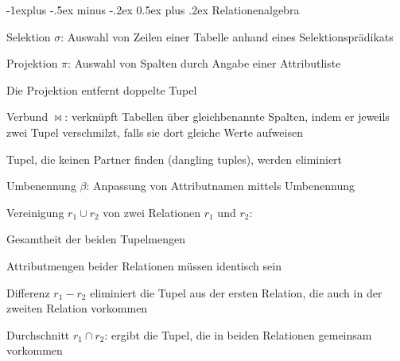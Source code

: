 \documentclass[a4paper]{article}
\makeatletter
\renewcommand{\subsection}{\@startsection{subsection}{2}{0mm}%
                                {-1explus -.5ex minus -.2ex}%
                                {0.5ex plus .2ex}%
                                {\normalfont\normalsize\bfseries}}
\makeatother
\begin{document}
\begin{multicols}{3}
    \subsection{Relationenalgebra}
    \begin{itemize*}
        \item Selektion $\sigma$: Auswahl von Zeilen einer Tabelle anhand eines Selektionsprädikats
        \item Projektion $\pi$: Auswahl von Spalten durch Angabe einer Attributliste
        \begin{itemize*}
            \item Die Projektion entfernt doppelte Tupel
        \end{itemize*}
        \item Verbund $\bowtie$: verknüpft Tabellen über gleichbenannte Spalten, indem er jeweils zwei Tupel verschmilzt, falls sie dort gleiche Werte aufweisen
        \begin{itemize*}
            \item Tupel, die keinen Partner finden (dangling tuples), werden eliminiert
        \end{itemize*}
        \item Umbenennung $\beta$: Anpassung von Attributnamen mittels Umbenennung
        \item Vereinigung $r_1 \cup r_2$ von zwei Relationen $r_1$ und $r_2$:
        \begin{itemize*}
            \item Gesamtheit der beiden Tupelmengen
            \item Attributmengen beider Relationen müssen identisch sein
        \end{itemize*}
        \item Differenz $r_1 - r_2$ eliminiert die Tupel aus der ersten Relation, die auch in der zweiten Relation vorkommen
        \item Durchschnitt $r_1 \cap r_2$: ergibt die Tupel, die in beiden Relationen gemeinsam vorkommen
    \end{itemize*}


\end{multicols}
\end{document}
